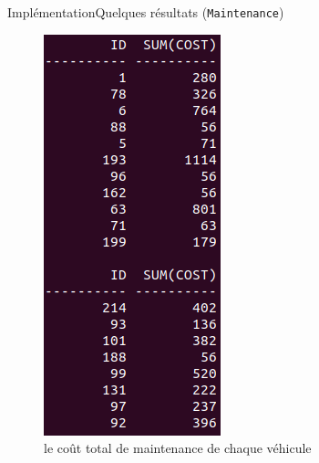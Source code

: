 \documentclass[a4paper,12pt,usenames,dvipsnames]{beamer}
\begin{document}
\begin{frame}{Implémentation}{Quelques résultats (\texttt{Maintenance})}
\begin{figure}[!ht]
  \centering
  \includegraphics[scale=0.3]{images/requetes_analytiques/requ6.png}
  \caption{le coût total de maintenance de chaque véhicule}
\end{figure}
\end{frame}
\end{document}
